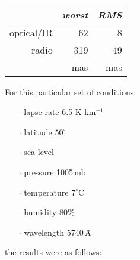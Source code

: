 \documentclass[11pt,twoside]{article}
\begin{document}
{\begin{enumerate}
        \vspace{2ex}

        ~~~~~~~~~~
        \begin{tabular}{|r|r|r|} \hline
              & {\it worst} & {\it RMS} \\ \hline
              optical/IR & 62 & 8 \\
              radio & 319 & 49 \\ \hline
              & mas & mas \\ \hline
        \end{tabular}

        \vspace{3ex}

        For this particular set of conditions:
        \begin{itemize}
        \item [$\cdot$] lapse rate 6.5 K km$^{-1}$
        \item [$\cdot$] latitude $50^\circ$
        \item [$\cdot$] sea level
        \item [$\cdot$] pressure 1005\,mb
        \item [$\cdot$] temperature $7^\circ$C
        \item [$\cdot$] humidity 80\%
        \item [$\cdot$] wavelength 5740\,\.{A}
        \end{itemize}
        the results were as follows:

        \vspace{2ex}


\end{enumerate}}
\end{document}
